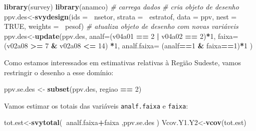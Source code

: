 \documentclass[]{book}
\newenvironment{Shaded}{\begin{snugshade}}{\end{snugshade}}
\newcommand{\KeywordTok}[1]{\textcolor[rgb]{0.13,0.29,0.53}{\textbf{#1}}}
\newcommand{\DataTypeTok}[1]{\textcolor[rgb]{0.13,0.29,0.53}{#1}}
\newcommand{\DecValTok}[1]{\textcolor[rgb]{0.00,0.00,0.81}{#1}}
\newcommand{\StringTok}[1]{\textcolor[rgb]{0.31,0.60,0.02}{#1}}
\newcommand{\CommentTok}[1]{\textcolor[rgb]{0.56,0.35,0.01}{\textit{#1}}}
\newcommand{\OtherTok}[1]{\textcolor[rgb]{0.56,0.35,0.01}{#1}}
\newcommand{\OperatorTok}[1]{\textcolor[rgb]{0.81,0.36,0.00}{\textbf{#1}}}
\newcommand{\NormalTok}[1]{#1}
\theoremstyle{definition}
\theoremstyle{definition}
\theoremstyle{definition}
\theoremstyle{remark}
\begin{document}
\begin{Shaded}
\begin{Highlighting}[]
\KeywordTok{library}\NormalTok{(survey)}
\KeywordTok{library}\NormalTok{(anamco) }\CommentTok{# carrega dados}
\CommentTok{# cria objeto de desenho}
\NormalTok{ppv.des<-}\KeywordTok{svydesign}\NormalTok{(}\DataTypeTok{ids =} \OperatorTok{~}\NormalTok{nsetor, }\DataTypeTok{strata =} \OperatorTok{~}\NormalTok{estratof,}
\DataTypeTok{data =}\NormalTok{ ppv, }\DataTypeTok{nest =} \OtherTok{TRUE}\NormalTok{, }\DataTypeTok{weights =} \OperatorTok{~}\NormalTok{pesof)}
\CommentTok{# atualiza objeto de desenho com novas variáveis}
\NormalTok{ppv.des<-}\KeywordTok{update}\NormalTok{(ppv.des,}
  \DataTypeTok{analf=}\NormalTok{(v04a01 }\OperatorTok{==}\StringTok{ }\DecValTok{2} \OperatorTok{|}\StringTok{ }\NormalTok{v04a02 }\OperatorTok{==}\StringTok{ }\DecValTok{2}\NormalTok{)}\OperatorTok{*}\DecValTok{1}\NormalTok{,}
  \DataTypeTok{faixa=}\NormalTok{(v02a08 }\OperatorTok{>=}\StringTok{ }\DecValTok{7} \OperatorTok{&}\StringTok{ }\NormalTok{v02a08 }\OperatorTok{<=}\StringTok{ }\DecValTok{14}\NormalTok{) }\OperatorTok{*}\DecValTok{1}\NormalTok{,}
  \DataTypeTok{analf.faixa=}\NormalTok{ (analf}\OperatorTok{==}\DecValTok{1} \OperatorTok{&}\StringTok{ }\NormalTok{faixa}\OperatorTok{==}\DecValTok{1}\NormalTok{)}\OperatorTok{*}\DecValTok{1}
\NormalTok{)}
\end{Highlighting}
\end{Shaded}

Como estamos interessados em estimativas relativas à Região Sudeste,
vamos restringir o desenho a esse domínio:

\begin{Shaded}
\begin{Highlighting}[]
\NormalTok{ppv.se.des <-}\StringTok{ }\KeywordTok{subset}\NormalTok{(ppv.des, regiao }\OperatorTok{==}\StringTok{ }\DecValTok{2}\NormalTok{)}
\end{Highlighting}
\end{Shaded}

Vamos estimar os totais das variáveis \texttt{analf.faixa} e
\texttt{faixa}:

\begin{Shaded}
\begin{Highlighting}[]
\NormalTok{tot.est<-}\KeywordTok{svytotal}\NormalTok{(}\OperatorTok{~}\NormalTok{analf.faixa}\OperatorTok{+}\NormalTok{faixa ,ppv.se.des )}
\NormalTok{Vcov.Y1.Y2<-}\KeywordTok{vcov}\NormalTok{(tot.est) }
\end{Highlighting}
\end{Shaded}
\end{document}
